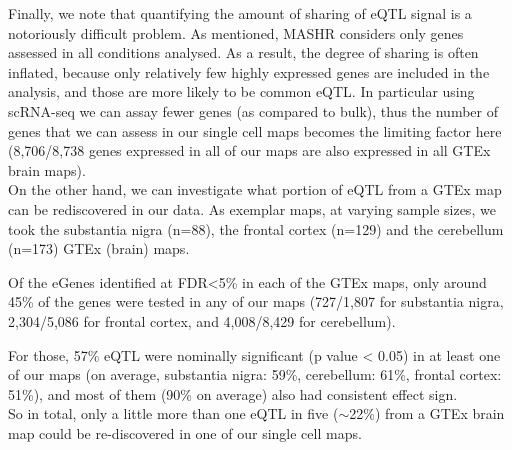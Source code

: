 Finally, we note that quantifying the amount of sharing of eQTL signal is a notoriously difficult problem.
As mentioned, MASHR considers only genes assessed in all conditions analysed. 
As a result, the degree of sharing is often inflated, because only relatively few highly expressed genes are included in the analysis, and those are more likely to be common eQTL. 
In particular using scRNA-seq we can assay fewer genes (as compared to bulk), thus the number of genes that we can assess in our single cell maps becomes the limiting factor here (8,706/8,738 genes expressed in all of our maps are also expressed in all GTEx brain maps).\\


On the other hand,
we can investigate what portion of eQTL from a GTEx map can be rediscovered in our data.
As exemplar maps, at varying sample sizes, we took the substantia nigra (n=88), the frontal cortex (n=129) and the cerebellum (n=173) GTEx (brain) maps.

Of the eGenes identified at FDR<5\% in each of the GTEx maps, only around 45\% of the genes were tested in any of our maps 
(727/1,807 for substantia nigra,
2,304/5,086 for frontal cortex, 
and 4,008/8,429 for cerebellum).

For those, 57\% eQTL were nominally significant (p value < 0.05) in at least one of our maps (on average, substantia nigra: 59\%, cerebellum: 61\%, frontal cortex: 51\%), 
and most of them
(90\% on average) also had consistent effect sign. \\

So in total, only a little more than one eQTL in five ($\sim$22\%)
from a GTEx brain map could be re-discovered in one of our single cell maps.



